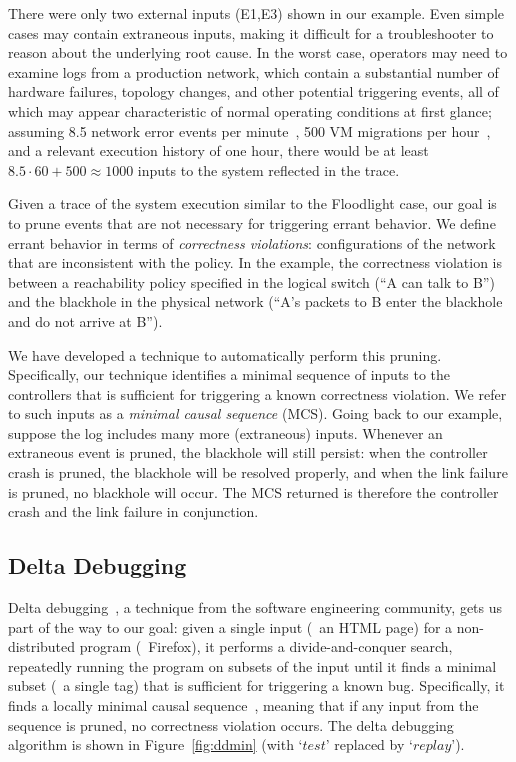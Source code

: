 There were only two external inputs (E1,E3) shown in our example.
Even simple cases may contain extraneous inputs, making it difficult
for a troubleshooter to reason about the underlying root cause.
In the worst case, operators may need to examine logs from a production
network, which contain a substantial number of hardware failures, topology changes,
and other potential triggering events,
all of which may appear characteristic of normal operating
conditions at first glance; assuming 8.5 network error events per
minute~\cite{Greenberg:2009:VSF:1592568.1592576}, 500 VM migrations per
hour~\cite{Soundararajan:2010:CBS:1899928.1899941}, and a relevant execution
history of one hour, there would be at least $8.5 \cdot 60 + 500 \approx 1000$ inputs to the system
reflected in the trace.

Given a trace of the system execution similar to the Floodlight case,
our goal is to prune events that are not
necessary for triggering errant behavior. We define errant behavior in terms
of {\em correctness violations}:
configurations of the network that are inconsistent
with the policy. In the example, the correctness violation is between a
reachability policy specified in the logical switch (``A can talk to B'')
and the blackhole in the physical network (``A's packets to B enter the
blackhole and do not arrive at B'').

We have developed a technique to automatically perform this pruning.
Specifically, our technique identifies a minimal sequence of inputs
to the controllers that is sufficient for triggering a known correctness violation. We
refer to such inputs as a {\em minimal causal sequence} (MCS). Going back to our example,
suppose the log includes many more (extraneous) inputs. Whenever an
extraneous event is pruned, the blackhole will still persist: when
the controller crash is pruned, the blackhole will be resolved properly, and
when the link failure is pruned, no blackhole will occur. The MCS returned
is therefore the controller crash and the link failure in conjunction.

\subsection{Delta Debugging}
\label{subsec:algorithm}

Delta debugging~\cite{Zeller:1999:YMP:318773.318946}, a technique from the
software engineering community, gets us part of the way
to our goal: given a single input (\eg~an HTML page)
for a non-distributed program (\eg~Firefox), it performs a divide-and-conquer
search, repeatedly running the program on subsets of the input
until it finds a minimal subset (\eg~a single tag) that is sufficient
for triggering a known bug. Specifically, it finds a locally minimal
causal sequence~\cite{Zeller:1999:YMP:318773.318946},
meaning that if any input from the sequence is pruned, no correctness violation
occurs. The delta debugging algorithm is shown in
Figure~\ref{fig:ddmin} (with `$test$' replaced by `$replay$').

